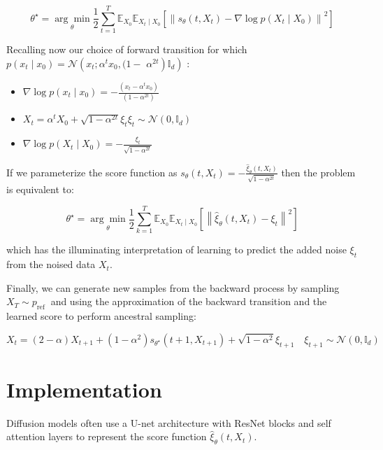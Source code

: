\documentclass[10pt]{article}
\begin{document}
$$
\theta^{\star}=\underset{\theta}{\arg \min } \frac{1}{2} \sum_{t=1}^{T} \mathbb{E}_{X_{0}} \mathbb{E}_{X_{t} \mid X_{0}}\left[\left\|s_{\theta}\left(t, X_{t}\right)-\nabla \log p\left(X_{t} \mid X_{0}\right)\right\|^{2}\right]
$$

Recalling now our choice of forward transition for which $p\left(x_{t} \mid x_{0}\right)=\mathcal{N}\left(x_{t} ; \alpha^{t} x_{0},(1-\right.$ $\left.\left.\alpha^{2 t}\right) \mathbb{I}_{d}\right)$ :

\begin{itemize}
  \item $\nabla \log p\left(x_{t} \mid x_{0}\right)=-\frac{\left(x_{t}-\alpha^{t} x_{0}\right)}{\left(1-\alpha^{2 t}\right)}$

  \item $X_{t}=\alpha^{t} X_{0}+\sqrt{1-\alpha^{2 t}} \xi_{t} \xi_{t} \sim \mathcal{N}\left(0, \mathbb{I}_{d}\right)$

  \item $\nabla \log p\left(X_{t} \mid X_{0}\right)=-\frac{\xi_{t}}{\sqrt{1-\alpha^{2 t}}}$

\end{itemize}

If we parameterize the score function as $s_{\theta}\left(t, X_{t}\right)=-\frac{\hat{\xi}_{\theta}\left(t, X_{t}\right)}{\sqrt{1-\alpha^{2 t}}}$ then the problem is equivalent to:

$$
\theta^{\star}=\underset{\theta}{\arg \min } \frac{1}{2} \sum_{k=1}^{T} \mathbb{E}_{X_{0}} \mathbb{E}_{X_{t} \mid X_{0}}\left[\left\|\hat{\xi}_{\theta}\left(t, X_{t}\right)-\xi_{t}\right\|^{2}\right]
$$

which has the illuminating interpretation of learning to predict the added noise $\xi_{t}$ from the noised data $X_{t}$.

Finally, we can generate new samples from the backward process by sampling $X_{T} \sim p_{\text {ref }}$ and using the approximation of the backward transition and the learned score to perform ancestral sampling:

$$
X_{t}=(2-\alpha) X_{t+1}+\left(1-\alpha^{2}\right) s_{\theta^{\star}}\left(t+1, X_{t+1}\right)+\sqrt{1-\alpha^{2}} \xi_{t+1} \quad \xi_{t+1} \sim \mathcal{N}\left(0, \mathbb{I}_{d}\right)
$$

\section*{Implementation}
Diffusion models often use a U-net architecture with ResNet blocks and self attention layers to represent the score function $\hat{\xi}_{\theta}\left(t, X_{t}\right)$.
\end{document}
